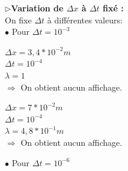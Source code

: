 $\triangleright$\textbf{Variation de  $\Delta x$ à $\Delta t$ fixé :}\\

On fixe $\Delta t$ à différentes valeurs:\\

\hspace*{1cm}$\bullet$ Pour $\Delta t= {10}^{-3}$ \\

\begin{enumerate}[label=\alph*)]

\begin{minipage}{.6\textwidth}%

\item $\Delta x=3,4*{10}^{-2}m$ \\
$\Delta t= {10}^{-4}$ \\
$\lambda= 1$\\


$\Longrightarrow$ On obtient aucun affichage.

\end{minipage}%
\hfill
\begin{minipage}{.6\textwidth}%

\item $\Delta x=7*{10}^{-2}m$ \\
$\Delta t= {10}^{-4}$ \\
$\lambda= 4,8*{10}^{-1}m$\\


$\Longrightarrow$ On obtient aucun affichage.\\

\end{minipage}%


\end{enumerate}

\vspace*{1cm}
\hspace*{1cm}$\bullet$ Pour $\Delta t= {10}^{-6}$ \\

